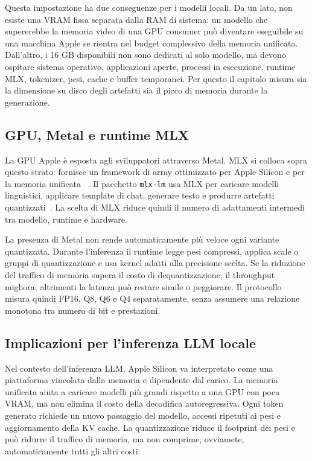 Questa impostazione ha due conseguenze per i modelli locali. Da un lato, non
esiste una VRAM fissa separata dalla RAM di sistema: un modello che supererebbe
la memoria video di una GPU consumer può diventare eseguibile su una macchina
Apple se rientra nel budget complessivo della memoria unificata. Dall'altro, i
16 GB disponibili non sono dedicati al solo modello, ma devono ospitare sistema
operativo, applicazioni aperte, processi in esecuzione, runtime MLX, tokenizer, pesi,
cache e buffer temporanei. Per questo il capitolo misura sia la dimensione su
disco degli artefatti sia il picco di memoria durante la generazione.

\subsection{GPU, Metal e runtime MLX}
\label{subsec:apple_gpu_metal_mlx}

La GPU Apple è esposta agli sviluppatori attraverso Metal.
MLX si colloca sopra questo strato: fornisce un
framework di array ottimizzato per Apple Silicon e per la memoria unificata
~\cite{apple2026mlx}. Il pacchetto \texttt{mlx-lm} usa MLX per caricare modelli
linguistici, applicare template di chat, generare testo e produrre artefatti
quantizzati~\cite{mlx2026lm}. La scelta di MLX riduce quindi il numero di
adattamenti intermedi tra modello, runtime e hardware.

La presenza di Metal non rende automaticamente più veloce ogni variante
quantizzata. Durante l'inferenza il runtime legge pesi compressi, applica scale
o gruppi di quantizzazione e usa kernel adatti alla precisione scelta. Se la
riduzione del traffico di memoria supera il costo di dequantizzazione, il
throughput migliora; altrimenti la latenza può restare simile o peggiorare. Il
protocollo misura quindi FP16, Q8, Q6 e Q4 separatamente, senza assumere una
relazione monotona tra numero di bit e prestazioni.

\subsection{Implicazioni per l'inferenza LLM locale}
\label{subsec:apple_llm_implications}

Nel contesto dell'inferenza LLM, Apple Silicon va interpretato come una
piattaforma vincolata dalla memoria e dipendente dal carico. La memoria
unificata aiuta a caricare modelli più grandi rispetto a una GPU con poca
VRAM, ma non elimina il costo della decodifica autoregressiva. Ogni token
generato richiede un nuovo passaggio del modello, accessi ripetuti ai pesi e
aggiornamento della KV cache. La quantizzazione riduce il footprint dei pesi e
può ridurre il traffico di memoria, ma non comprime, ovviamete, automaticamente tutti gli
altri costi.


